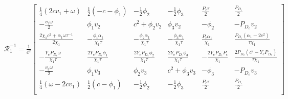 \begin{align*}
  \mathcal{R}_{1}^{-1} = \frac{1}{c^2}
  \left[
  \begin{array}{cccccc}
   \frac{1}{4} (2 c  v_{1}+\omega ) & \frac{1}{2} (-c- \phi_{1} ) & -\frac{1}{2} \phi_{2}
    & -\frac{1}{2} \phi_{3}  & \frac{P_{\epsilon} \tau }{2} & \frac{P_{D_{e}}}{2}
     \\
   -\frac{v_{2} \omega }{2} & \phi_{1} v_{2}  & c^2+\phi_{2} v_{2}  &
     \phi_{3} v_{2}  & -\phi_{2}  & -P_{D_{e}} v_{2}
     \\
   \frac{2 \chi_{1}  c^2+\alpha_{1}  \omega \tau^{-1} }{2 \chi_{1} } & -\frac{\phi_{1} \alpha_{1}  }{\chi_{1} \tau } &
     -\frac{\phi_{2} \alpha_{1}  }{\chi_{1} \tau } & -\frac{\phi_{3} \alpha_{1} }{\chi_{1} \tau } &
     \frac{P_{\epsilon} \alpha_{1} }{\chi_{1} } & \frac{P_{D_{e}} \left(\alpha_{1} -2 c^2\right)}{\tau \chi_{1} }
      \\
   -\frac{Y_{e} P_{D_{e}} \omega }{\chi_{1} \tau } & \frac{2 Y_{e} P_{D_{e}} \phi_{1} }{\chi_{1} \tau } & \frac{2 Y_{e} P_{D_{e}}
     \phi_{2} }{\chi_{1} \tau} & \frac{2 Y_{e} P_{D_{e}} \phi_{3} }{\chi_{1} \tau} & -\frac{2 Y_{e}
     P_{D_{e}} P_{\epsilon} }{\chi_{1} } & \frac{2 P_{D_{e}} \left(c^2-Y_{e} P_{D_{e}} \right)}{\tau \chi_{1} }
      \\
   -\frac{v_{3} \omega }{2} & \phi_{1} v_{3}  & \phi_{2} v_{3}   &
     c^2+\phi_{3} v_{3}  & -\phi_{3}  & -P_{D_{e}} v_{3}
      \\
   \frac{1}{4} (\omega -2 c  v_{1}) & \frac{1}{2} (c-\phi_{1} ) & -\frac{1}{2} \phi_{2}
       & -\frac{1}{2} \phi_{3}  & \frac{P_{\epsilon} \tau }{2} & \frac{P_{D_{e}}}{2}
     \\
  \end{array}
  \right]
\end{align*}

